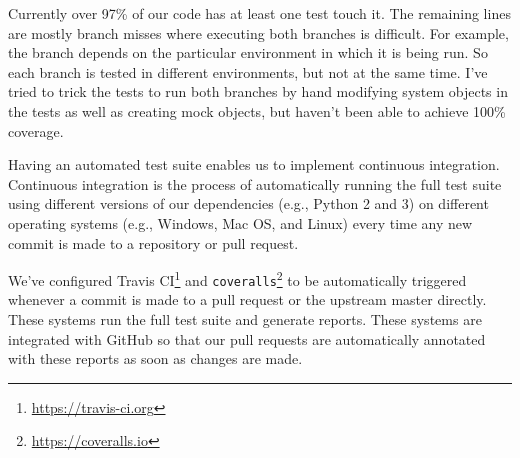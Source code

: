 %
%

Currently over 97\% of our code has at least one test touch it.  The remaining
lines are mostly branch misses where executing both branches is difficult.  For
example, the branch depends on the particular environment in which it is being
run. So each branch is tested in different environments, but not at the same
time.  I've tried to trick the tests to run both branches by hand modifying
system objects in the tests as well as creating mock objects, but haven't been
able to achieve 100\% coverage.


Having an automated test suite enables us to implement continuous integration.
Continuous integration is the process of automatically running the full test
suite using different versions of our dependencies (e.g., Python 2 and 3) on
different operating systems (e.g., Windows, Mac OS, and Linux) every time any
new commit is made to a repository or pull request.

We've configured Travis CI\footnote{\url{https://travis-ci.org}} and
\texttt{coveralls}\footnote{\url{https://coveralls.io}} to be automatically
triggered whenever a commit is made to a pull request or the upstream
master directly.  These systems run the full test suite and generate reports.
These systems are integrated with GitHub so that our pull requests are
automatically annotated with these reports as soon as changes are made.

